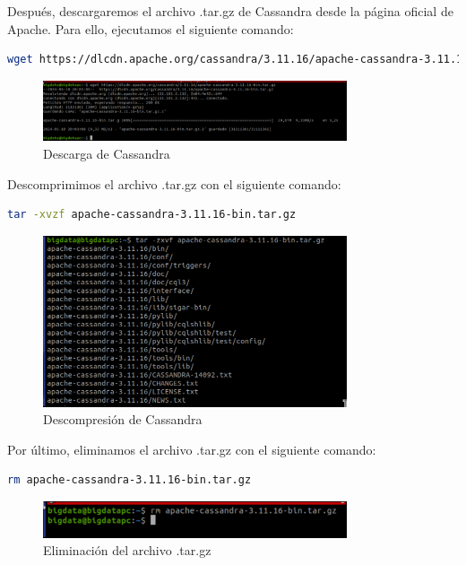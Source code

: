 Después, descargaremos el archivo .tar.gz de Cassandra desde la página oficial de Apache. Para ello, ejecutamos el siguiente comando:

\begin{lstlisting}[language=bash]
    wget https://dlcdn.apache.org/cassandra/3.11.16/apache-cassandra-3.11.16-bin.tar.gz
\end{lstlisting}

\begin{figure}[H]
    \centering
    \includegraphics[width=0.8\textwidth]{figures/3.png}
    \caption{Descarga de Cassandra}
\end{figure}

Descomprimimos el archivo .tar.gz con el siguiente comando:

\begin{lstlisting}[language=bash]
    tar -xvzf apache-cassandra-3.11.16-bin.tar.gz
\end{lstlisting}

\begin{figure}[H]
    \centering
    \includegraphics[width=0.8\textwidth]{figures/4.png}
    \caption{Descompresión de Cassandra}
\end{figure}

Por último, eliminamos el archivo .tar.gz con el siguiente comando:

\begin{lstlisting}[language=bash]
    rm apache-cassandra-3.11.16-bin.tar.gz
\end{lstlisting}

\begin{figure}[H]
    \centering
    \includegraphics[width=0.8\textwidth]{figures/5.png}
    \caption{Eliminación del archivo .tar.gz}
\end{figure}

